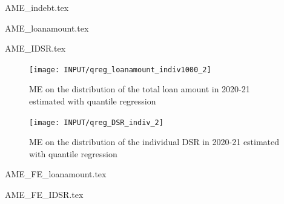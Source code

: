 \documentclass[a4paper, 12pt, onecolumn]{article}
\begin{document}
{AME_indebt.tex}

{AME_loanamount.tex}

{AME_IDSR.tex}

\begin{figure}[!h]
\raggedright
\texttt{[image: INPUT/qreg\_loanamount\_indiv1000\_2]}
\caption{ME on the distribution of the total loan amount in 2020-21 estimated with quantile regression}
\label{fig:qreg_loanamount}
\end{figure}

\begin{figure}[!h]
\raggedright
\texttt{[image: INPUT/qreg\_DSR\_indiv\_2]}
\caption{ME on the distribution of the individual DSR in 2020-21 estimated with quantile regression}
\label{fig:qreg_dsr}
\end{figure}

{AME_FE_loanamount.tex}

{AME_FE_IDSR.tex}



\clearpage
\newpage
\appendix
{}







\end{document}
